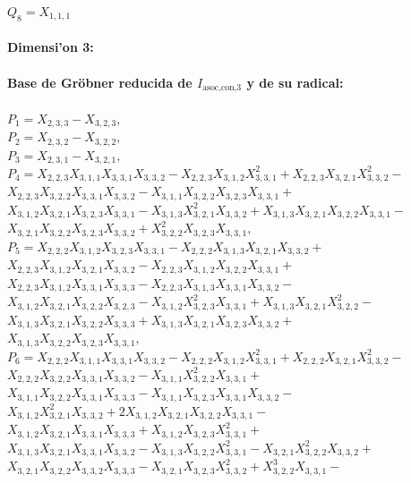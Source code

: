 \documentclass[10pt]{beamer}
\begin{document}
$Q_{8}=X_{1,1,1}$\\
\\
\textbf{Dimensi'on 3:}\\
\\
\textbf{Base de Gr\"obner reducida de $I_{\text{asoc,con,}3}$ y de su radical:}\\
\\
$P_{1}=X_{2,3,3}-X_{3,2,3},$\\
$P_{2}=X_{2,3,2}-X_{3,2,2},$\\
$P_{3}=X_{2,3,1}-X_{3,2,1},$\\
$P_{4}=X_{2,2,3}X_{3,1,1}X_{3,3,1}X_{3,3,2}-X_{2,2,3}X_{3,1,2}X_{3,3,1}^2+X_{2,2,3}X_{3,2,1}X_{3,3,2}^2-$\\
$X_{2,2,3}X_{3,2,2}X_{3,3,1}X_{3,3,2}-X_{3,1,1}X_{3,2,2}X_{3,2,3}X_{3,3,1}+$\\
$X_{3,1,2}X_{3,2,1}X_{3,2,3}X_{3,3,1}-X_{3,1,3}X_{3,2,1}^2X_{3,3,2}+X_{3,1,3}X_{3,2,1}X_{3,2,2}X_{3,3,1}-$\\
$X_{3,2,1}X_{3,2,2}X_{3,2,3}X_{3,3,2}+X_{3,2,2}^2X_{3,2,3}X_{3,3,1},$\\
$P_{5}=X_{2,2,2}X_{3,1,2}X_{3,2,3}X_{3,3,1}-X_{2,2,2}X_{3,1,3}X_{3,2,1}X_{3,3,2}+$\\
$X_{2,2,3}X_{3,1,2}X_{3,2,1}X_{3,3,2}-X_{2,2,3}X_{3,1,2}X_{3,2,2}X_{3,3,1}+$\\
$X_{2,2,3}X_{3,1,2}X_{3,3,1}X_{3,3,3}-X_{2,2,3}X_{3,1,3}X_{3,3,1}X_{3,3,2}-$\\
$X_{3,1,2}X_{3,2,1}X_{3,2,2}X_{3,2,3}-X_{3,1,2}X_{3,2,3}^2X_{3,3,1}+X_{3,1,3}X_{3,2,1}X_{3,2,2}^2-$\\
$X_{3,1,3}X_{3,2,1}X_{3,2,2}X_{3,3,3}+X_{3,1,3}X_{3,2,1}X_{3,2,3}X_{3,3,2}+$\\
$X_{3,1,3}X_{3,2,2}X_{3,2,3}X_{3,3,1},$\\
$P_{6}=X_{2,2,2}X_{3,1,1}X_{3,3,1}X_{3,3,2}-X_{2,2,2}X_{3,1,2}X_{3,3,1}^2+X_{2,2,2}X_{3,2,1}X_{3,3,2}^2-$\\
$X_{2,2,2}X_{3,2,2}X_{3,3,1}X_{3,3,2}-X_{3,1,1}X_{3,2,2}^2X_{3,3,1}+$\\
$X_{3,1,1}X_{3,2,2}X_{3,3,1}X_{3,3,3}-X_{3,1,1}X_{3,2,3}X_{3,3,1}X_{3,3,2}-$\\
$X_{3,1,2}X_{3,2,1}^2X_{3,3,2}+2X_{3,1,2}X_{3,2,1}X_{3,2,2}X_{3,3,1}-$\\
$X_{3,1,2}X_{3,2,1}X_{3,3,1}X_{3,3,3}+X_{3,1,2}X_{3,2,3}X_{3,3,1}^2+$\\
$X_{3,1,3}X_{3,2,1}X_{3,3,1}X_{3,3,2}-X_{3,1,3}X_{3,2,2}X_{3,3,1}^2-X_{3,2,1}X_{3,2,2}^2X_{3,3,2}+$\\
$X_{3,2,1}X_{3,2,2}X_{3,3,2}X_{3,3,3}-X_{3,2,1}X_{3,2,3}X_{3,3,2}^2+X_{3,2,2}^3X_{3,3,1}-$\\
\end{document}
